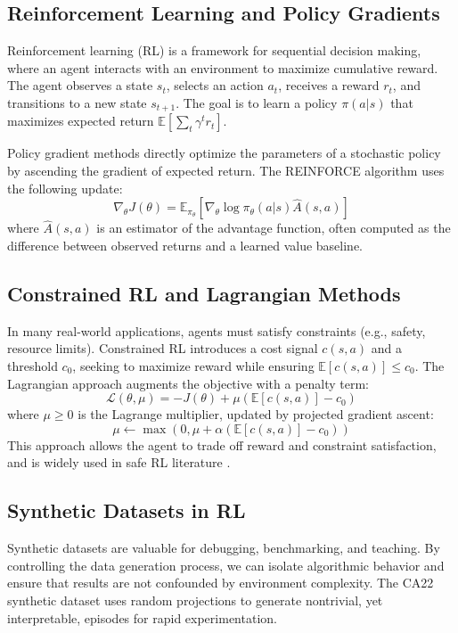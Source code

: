 \documentclass[11pt]{article}
\begin{document}
\subsection{Reinforcement Learning and Policy Gradients}
Reinforcement learning (RL) is a framework for sequential decision making, where an agent interacts with an environment to maximize cumulative reward. The agent observes a state $s_t$, selects an action $a_t$, receives a reward $r_t$, and transitions to a new state $s_{t+1}$. The goal is to learn a policy $\pi(a|s)$ that maximizes expected return $\mathbb{E}[\sum_t \gamma^t r_t]$.

Policy gradient methods directly optimize the parameters of a stochastic policy by ascending the gradient of expected return. The REINFORCE algorithm uses the following update:
\begin{equation}
\nabla_\theta J(\theta) = \mathbb{E}_{\pi_\theta} [\nabla_\theta \log \pi_\theta(a|s) \hat{A}(s,a)]
\end{equation}
where $\hat{A}(s,a)$ is an estimator of the advantage function, often computed as the difference between observed returns and a learned value baseline.

\subsection{Constrained RL and Lagrangian Methods}
In many real-world applications, agents must satisfy constraints (e.g., safety, resource limits). Constrained RL introduces a cost signal $c(s,a)$ and a threshold $c_0$, seeking to maximize reward while ensuring $\mathbb{E}[c(s,a)] \leq c_0$. The Lagrangian approach augments the objective with a penalty term:
\begin{equation}
\mathcal{L}(\theta, \mu) = -J(\theta) + \mu (\mathbb{E}[c(s,a)] - c_0)
\end{equation}
where $\mu \geq 0$ is the Lagrange multiplier, updated by projected gradient ascent:
\begin{equation}
\mu \leftarrow \max(0, \mu + \alpha (\mathbb{E}[c(s,a)] - c_0))
\end{equation}
This approach allows the agent to trade off reward and constraint satisfaction, and is widely used in safe RL literature \citep{Achiam2017}.

\subsection{Synthetic Datasets in RL}
Synthetic datasets are valuable for debugging, benchmarking, and teaching. By controlling the data generation process, we can isolate algorithmic behavior and ensure that results are not confounded by environment complexity. The CA22 synthetic dataset uses random projections to generate nontrivial, yet interpretable, episodes for rapid experimentation.
\end{document}

